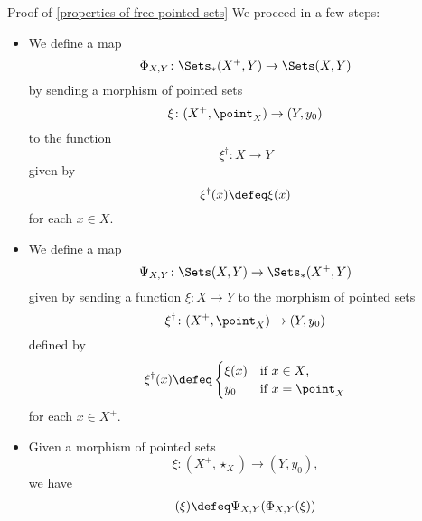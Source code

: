 \begin{Proof}{Proof of \cref{properties-of-free-pointed-sets}}
    We proceed in a few steps:
    \begin{itemize}
        \item\label{proof-of-properties-of-free-pointed-sets-adjointness-1}We define a map
            \[
                \Phi_{X,Y}%
                \colon%
                \Sets_{*}(X^{+},Y)%
                \to%
                \Sets(X,Y)%
            \]%
            by sending a morphism of pointed sets
            \[
                \xi%
                \colon%
                (X^{+},\point_{X})%
                \to%
                (Y,y_{0})%
            \]%
            to the function%
            \[
                \xi^{\dagger}%
                \colon%
                X%
                \to%
                Y%
            \]%
            given by
            \[
                \xi^{\dagger}(x)%
                \defeq
                \xi(x)%
            \]%
            for each $x\in X$.
        \item\label{proof-of-properties-of-free-pointed-sets-adjointness-2}We define a map
            \[
                \Psi_{X,Y}%
                \colon%
                \Sets(X,Y)%
                \to%
                \Sets_{*}(X^{+},Y)%
            \]%
            given by sending a function $\xi\colon X\to Y$ to the morphism of pointed sets
            \[
                \xi^{\dagger}%
                \colon%
                (X^{+},\point_{X})%
                \to%
                (Y,y_{0})%
            \]%
            defined by
            \[
                \xi^{\dagger}(x)%
                \defeq%
                \begin{cases}
                    \xi(x) & \text{if $x\in X$,}\\
                    y_{0}  & \text{if $x=\point_{X}$}
                \end{cases}
            \]%
            for each $x\in X^{+}$.
        \item\label{proof-of-properties-of-free-pointed-sets-adjointness-3}Given a morphism of pointed sets
            \[
                \xi%
                \colon%
                (X^{+},\star_{X})%
                \to%
                (Y,y_{0}),%
            \]%
            we have
            \begin{align*}
                [\Psi_{X,Y}\circ\Phi_{X,Y}](\xi) &\defeq \Psi_{X,Y}(\Phi_{X,Y}(\xi))\\%

\end{align*}
\end{itemize}
\end{Proof}
